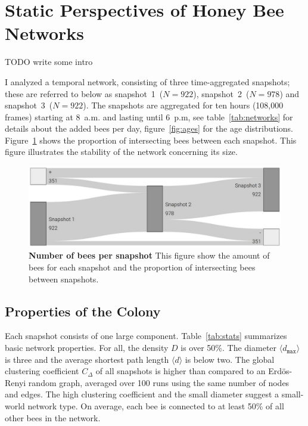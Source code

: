 \section{Static Perspectives of Honey Bee Networks}

TODO write some intro

I analyzed a temporal network, consisting of three time-aggregated snapshots; these are referred to below as snapshot~1~($N=922$), snapshot~2~($N=978$) and snapshot~3~($N=922$). 
The snapshots are aggregated for ten hours (108,000 frames) starting at 8~a.m. and lasting until 6~p.m, see table~\ref{tab:networks} for details about the added bees per day,  figure~\ref{fig:ages} for the age distributions. Figure~\ref{fig:network-matching} shows the proportion of intersecting bees between each snapshot. This figure illustrates the stability of the network concerning its size. 



\begin{figure}[htb]
	\centering
	\includegraphics[width=.8\textwidth]{Figures/network_matching}
	\caption[Number of bees per snapshot]{\textbf{Number of bees per snapshot} This figure show the amount of bees for each snapshot and the proportion of intersecting bees between snapshots.}
	\label{fig:network-matching}
\end{figure}

\subsection{Properties of the Colony}
Each snapshot consists of one large component.
Table~\ref{tab:stats} summarizes basic network properties.
For all, the density $D$ is over 50\%.
The diameter $\langle d_{\texttt{max}} \rangle$ is three and the average shortest path length $\langle d \rangle$ is below two.
The global clustering coefficient $C_\Delta$ of all snapshots is higher than compared to an Erdös-Renyi random graph, averaged over 100 runs using the same number of nodes and edges.
The high clustering coefficient and the small diameter suggest a small-world network type.
On average, each bee is connected to at least 50\% of all other bees in the network.

